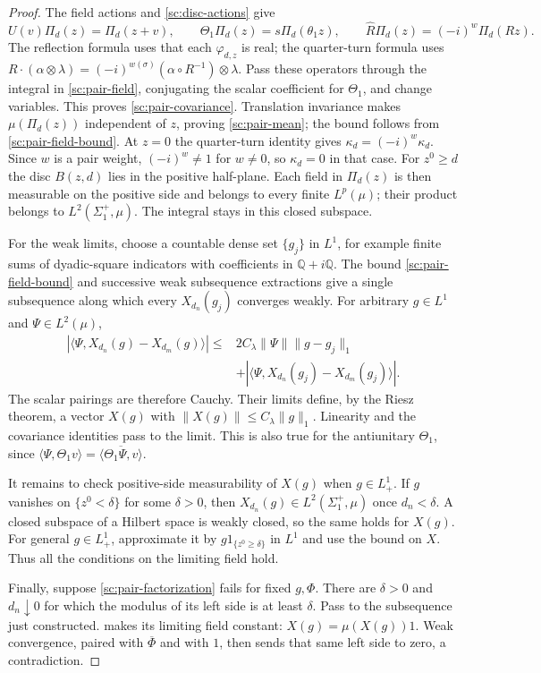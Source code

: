 \documentclass[11pt,letterpaper,reqno]{amsart}
\theoremstyle{definition}
\theoremstyle{remark}
\begin{document}
\begin{proof}
The field actions and \eqref{sc:disc-actions} give
\[
U(v)\Pi_d(z)=\Pi_d(z+v),\qquad
\Theta_1\Pi_d(z)=s\Pi_d(\theta_1z),\qquad
\hat R\Pi_d(z)=(-i)^w\Pi_d(Rz).
\]
The reflection formula uses that each $\varphi_{d,z}$ is real; the
quarter-turn formula uses
$R\cdot(\alpha\otimes\lambda)=(-i)^{w(\sigma)}
(\alpha\circ R^{-1})\otimes\lambda$.
Pass these operators through the integral in \eqref{sc:pair-field},
conjugating the scalar coefficient for $\Theta_1$, and change variables.
This proves \eqref{sc:pair-covariance}.
Translation invariance makes $\mu(\Pi_d(z))$ independent of $z$, proving
\eqref{sc:pair-mean}; the bound follows from
\eqref{sc:pair-field-bound}. At $z=0$ the quarter-turn identity gives
$\kappa_d=(-i)^w\kappa_d$. Since $w$ is a pair weight,
$(-i)^w\ne1$ for $w\ne0$, so $\kappa_d=0$ in that case.
For $z^0\ge d$ the disc $B(z,d)$ lies in the positive half-plane.
Each field in $\Pi_d(z)$ is then measurable on the positive side and
belongs to every finite $L^p(\mu)$; their product belongs to
$L^2(\Sigma_1^+,\mu)$. The integral stays in this closed subspace.

For the weak limits, choose a countable dense set $\{g_j\}$ in $L^1$,
for example finite sums of dyadic-square indicators with coefficients
in $\mathbb Q+i\mathbb Q$.
The bound \eqref{sc:pair-field-bound} and successive weak
subsequence extractions give a single subsequence along which every
$X_{d_n}(g_j)$ converges weakly. For arbitrary $g\in L^1$ and
$\Psi\in L^2(\mu)$,
\[
\begin{split}
|\langle\Psi,X_{d_n}(g)-X_{d_m}(g)\rangle|
\le{}&2C_\lambda\|\Psi\|\|g-g_j\|_1\\
&+|\langle\Psi,X_{d_n}(g_j)-X_{d_m}(g_j)\rangle|.
\end{split}
\]
The scalar pairings are therefore Cauchy. Their limits define, by the
Riesz theorem, a vector $X(g)$ with
$\|X(g)\|\le C_\lambda\|g\|_1$. Linearity and the covariance identities
pass to the limit. This is also true for the antiunitary $\Theta_1$,
since $\langle\Psi,\Theta_1v\rangle
=\overline{\langle\Theta_1\Psi,v\rangle}$.

It remains to check positive-side measurability of $X(g)$ when
$g\in L^1_+$. If $g$ vanishes on $\{z^0<\delta\}$ for some $\delta>0$,
then $X_{d_n}(g)\in L^2(\Sigma_1^+,\mu)$ once $d_n<\delta$.
A closed subspace of a Hilbert space is weakly closed, so the same holds
for $X(g)$. For general $g\in L^1_+$, approximate it by
$g1_{\{z^0\ge\delta\}}$ in $L^1$ and use the bound on $X$.
Thus all the conditions on the limiting field hold.

Finally, suppose \eqref{sc:pair-factorization} fails for fixed $g,\Phi$.
There are $\delta>0$ and $d_n\downarrow0$ for which the modulus of its
left side is at least $\delta$. Pass to the subsequence just constructed.
 makes its limiting field constant:
$X(g)=\mu(X(g))1$. Weak convergence, paired with $\overline\Phi$ and
with $1$, then sends that same left side to zero, a contradiction.
\end{proof}
\end{document}

